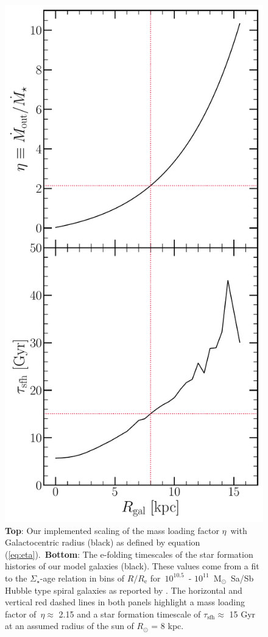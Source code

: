 \documentclass[fleqn, usenatbib]{mnras}
\newcommand{\refp}[1]{(\ref{#1})}
\begin{document}
\begin{figure} 
\centering 
\includegraphics[scale = 0.45]{eta_tau_sfh.pdf} 
\caption{\textbf{Top}: Our implemented scaling of the mass loading factor 
$\eta$~with Galactocentric radius (black) as defined by equation 
\refp{eq:eta}.~\textbf{Bottom}: The e-folding timescales of the star formation 
histories of our model galaxies (black). These values come from a fit to the 
$\Sigma_\star$-age relation in bins of $R/R_\text{e}$ for~$10^{10.5}$~- 
$10^{11}$~M$_\odot$~Sa/Sb Hubble type spiral galaxies as reported by 
\citet[][see discussion in~\S~\ref{sec:methods:sfhs}]{Sanchez2020}. The 
horizontal and vertical red dashed lines in both panels highlight a mass 
loading factor of~$\eta \approx$ 2.15 and a star formation timescale of 
$\tau_\text{sfh} \approx$ 15 Gyr at an assumed radius of the sun of 
$R_\odot$ = 8 kpc. 
} 
\label{fig:eta_tau_sfh} 
\end{figure} 
\end{document}

